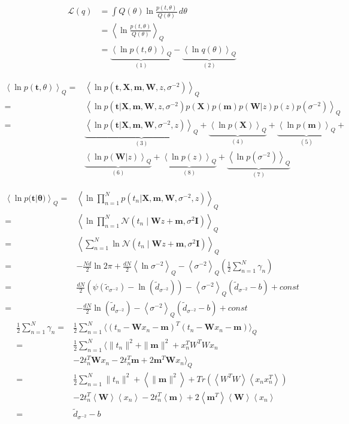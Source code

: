 \documentclass[10pt]{article}
\newcommand{\Angle}[1]{\left \langle #1 \right \rangle}
\newcommand{\Eq}[1]{\Angle{#1}_Q}
\newcommand{\N}[2][]{\mathcal{N} \left( #1,#2 \right)}
\newcommand{\Tr}[1]{Tr\left( #1 \right)}
\begin{document}
	\begin{align}
		\mathcal{L}(q)&=\int Q(\theta) \ln{\frac{p(t,\theta)}{Q(\theta)}} \, d\theta \\
		&=\Eq{\ln{\frac{p(t,\theta)}{Q(\theta)}}} \\
		&=\underbrace{\Eq{\ln{p(t,\theta)}}}_{(1)} - \underbrace{\Eq{\ln{q(\theta)}}}_{(2)}
	\end{align}
	
	\begin{align}
		\Eq{\ln{p(\bm{t},\theta)}}=&\Eq{\ln{p(\bm{t},\bm{X},\bm{m},\bm{W},z,\sigma^{-2})}} \\
		=&\Eq{\ln{p(\bm{t}|\bm{X},\bm{m},\bm{W},z,\sigma^{-2})p(\bm{X})p(\bm{m})p(\bm{W} \vert z)p(z)p(\sigma^{-2})}} \\
		=&\underbrace{\Eq{\ln{p(\bm{t}|\bm{X},\bm{m},\bm{W},\sigma^{-2},z)}}}_{(3)}+\underbrace{\Eq{\ln{p(\bm{X})}}}_{(4)}+\underbrace{\Eq{\ln{p(\bm{m})}}}_{(5)}+\\
		& \underbrace{\Eq{\ln{p(\bm{W}\vert z)}}}_{(6)}+\underbrace{\Eq{\ln{p(z)}}}_{(8)}+\underbrace{\Eq{\ln{p(\sigma^{-2})}}}_{(7)} \nonumber
	\end{align}
	
	\begin{align}
		\Eq{\ln{p(\bm{t}|\bm{\theta)}}}=&\Eq{\ln{\prod_{n=1}^{N}{p(t_n|\bm{X},\bm{m},\bm{W},\sigma^{-2},z)}}} \\
		=&\Eq{\ln{\prod_{n=1}^{N}{\N[t_n \mid \bm{W}z+\bm{m}]{\sigma^2\bm{I}}}}} \\
		=&\Eq{\sum_{n=1}^{N}{\ln{\N[t_n \mid \bm{W}z+\bm{m}]{\sigma^2\bm{I}}}}} \\
		=&-\frac{Nd}{2}\ln{2\pi}+\frac{dN}{2}\Eq{\ln{\sigma^{-2}}}-\Eq{\sigma^{-2}}\left(\frac{1}{2}\sum_{n=1}^{N}{\gamma_n} \right) \\
		=&\frac{dN}{2}(\psi(\tilde{c}_{\sigma^{-2}})-\ln(\tilde{d}_{\sigma^{-2}}))-\Eq{\sigma^{-2}}\left(\tilde{d}_{\sigma^{-2}}-b\right) + const \\
		=&-\frac{dN}{2}\ln(\tilde{d}_{\sigma^{-2}})-\Eq{\sigma^{-2}}\left(\tilde{d}_{\sigma^{-2}}-b\right) + const
	\end{align}
	\begin{align}
		\frac{1}{2}\sum_{n=1}^N \gamma_n=&\frac{1}{2}\sum_{n=1}^N\langle(t_n-\bm{W}x_n-\bm{m})^T(t_n-\bm{W}x_n-\bm{m})\rangle_Q \\
		=& \frac{1}{2}\sum_{n=1}^N \langle \|t_n\|^2+\|\bm{m}\|^2+x_n^TW^TWx_n \\
		&-2t_n^T\bm{W}x_n-2t_n^T\bm{m}+2\bm{m}^T\bm{W}x_n \rangle_Q \nonumber \\ 
		=&\frac{1}{2}\sum_{n=1}^N\|t_n\|^2+\Angle{\|\bm{m}\|^2}+\Tr{\Angle{W^TW}\Angle{x_nx_n^T}} \\
		&-2t_n^T\Angle{\bm{W}}\Angle{x_n}-2t_n^T\Angle{\bm{m}}+2\Angle{\bm{m}^T}\Angle{\bm{W}}\Angle{x_n} \\
		=& \tilde{d}_{\sigma^{-2}}-b
	\end{align}
	
\end{document}
